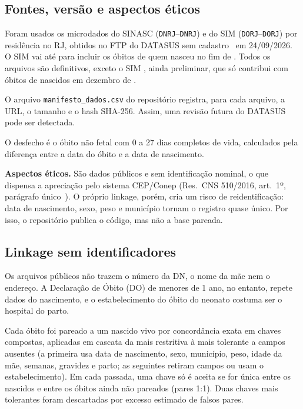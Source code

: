 \documentclass[12pt]{article}
\begin{document}
\subsection{Fontes, versão e aspectos éticos}

Foram usados os microdados do SINASC (\texttt{DNRJ\anoIni}--\texttt{DNRJ\anoFim}) e do SIM (\texttt{DORJ\anoIni}--\texttt{DORJ\anoObFim}) por residência no RJ, obtidos no FTP do DATASUS sem cadastro~\cite{datasus} em 24/09/2026. O SIM vai até \anoObFim{} para incluir os óbitos de quem nasceu no fim de \anoFim{}. Todos os arquivos são definitivos, exceto o SIM \anoObFim, ainda preliminar, que só contribui com óbitos de nascidos em dezembro de \anoFim{}.

O arquivo \texttt{manifesto\_dados.csv} do repositório registra, para cada arquivo, a URL, o tamanho e o hash SHA-256. Assim, uma revisão futura do DATASUS pode ser detectada.

O desfecho é o óbito não fetal com 0 a 27 dias completos de vida, calculados pela diferença entre a data do óbito e a data de nascimento.

\textbf{Aspectos éticos.} São dados públicos e sem identificação nominal, o que dispensa a apreciação pelo sistema CEP/Conep (Res.\ CNS 510/2016, art.~1º, parágrafo único~\cite{cns510}). O próprio linkage, porém, cria um risco de reidentificação: data de nascimento, sexo, peso e município tornam o registro quase único. Por isso, o repositório publica o código, mas não a base pareada.

\subsection{Linkage sem identificadores}

Os arquivos públicos não trazem o número da DN, o nome da mãe nem o endereço. A Declaração de Óbito (DO) de menores de 1 ano, no entanto, repete dados do nascimento, e o estabelecimento do óbito do neonato costuma ser o hospital do parto.

Cada óbito foi pareado a um nascido vivo por concordância exata em \nPassadas{} chaves compostas, aplicadas em cascata da mais restritiva à mais tolerante a campos ausentes (a primeira usa data de nascimento, sexo, município, peso, idade da mãe, semanas, gravidez e parto; as seguintes retiram campos ou usam o estabelecimento). Em cada passada, uma chave só é aceita se for única entre os nascidos e entre os óbitos ainda não pareados (pares 1:1). Duas chaves mais tolerantes foram descartadas por excesso estimado de falsos pares.
\end{document}
